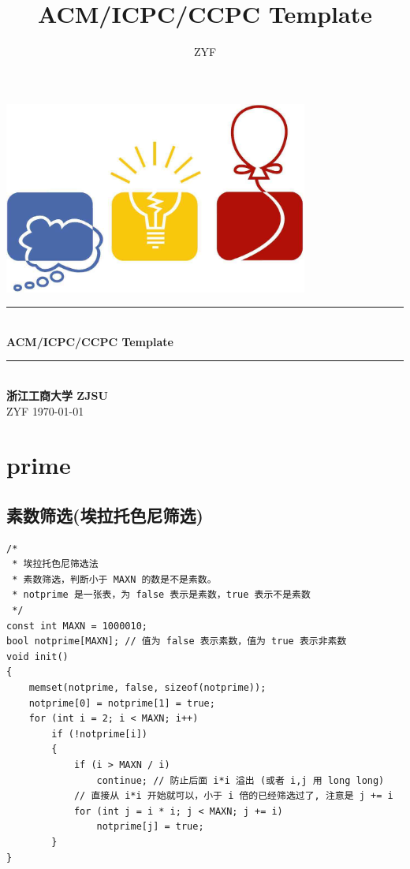 \documentclass[twoside]{article}
\title{ACM/ICPC/CCPC Template}
\author{ZYF}
\newcommand{\HRule}{\rule{\linewidth}{0.5mm}}
\begin{document}
\small
\begin{titlepage}
\begin{center}
\vspace*{0.5cm}\includegraphics[width=0.75\textwidth]{logo.jpg} \\ [2cm]
\HRule \\ [1cm]
\textbf{\Huge{ACM/ICPC/CCPC Template}} \\ [0.5cm]
\HRule \\ [4cm]
\textbf{\Huge{浙江工商大学 ZJSU}} \\ [1cm]
\LARGE{ZYF}
\vfill
\Large{\today}
\end{center}
\clearpage
\end{titlepage}
\tableofcontents\clearpage
\pagestyle{fancy}
\lfoot{}
\cfoot{\thepage}\rfoot{}
\setcounter{section}{-1}
\setcounter{page}{1}
\clearpage\section{prime}
\subsection{素数筛选(埃拉托色尼筛选)}
\begin{lstlisting}
/*
 * 埃拉托色尼筛选法
 * 素数筛选，判断小于 MAXN 的数是不是素数。
 * notprime 是一张表，为 false 表示是素数，true 表示不是素数
 */
const int MAXN = 1000010;
bool notprime[MAXN]; // 值为 false 表示素数，值为 true 表示非素数
void init()
{
    memset(notprime, false, sizeof(notprime));
    notprime[0] = notprime[1] = true;
    for (int i = 2; i < MAXN; i++)
        if (!notprime[i])
        {
            if (i > MAXN / i)
                continue; // 防止后面 i*i 溢出 (或者 i,j 用 long long)
            // 直接从 i*i 开始就可以，小于 i 倍的已经筛选过了, 注意是 j += i
            for (int j = i * i; j < MAXN; j += i)
                notprime[j] = true;
        }
}
\end{lstlisting}
\end{document}
